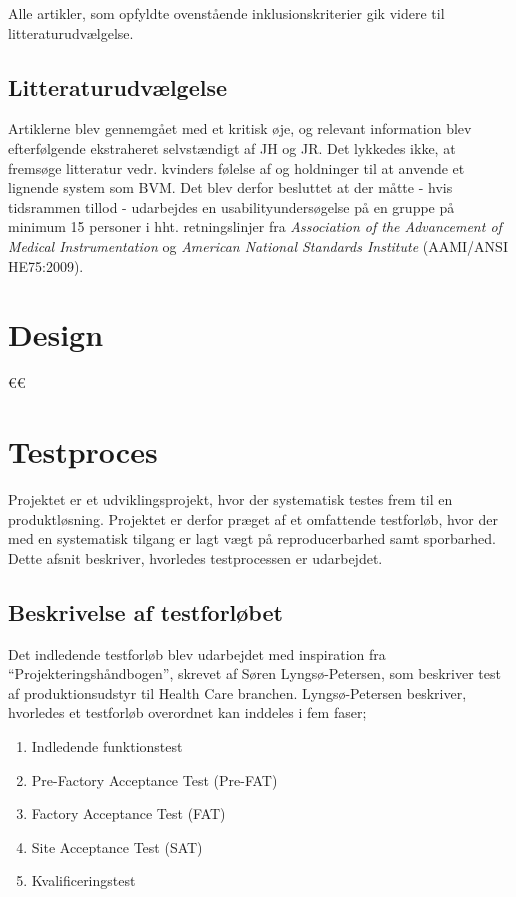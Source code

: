 	Alle artikler, som opfyldte ovenstående inklusionskriterier gik videre til litteraturudvælgelse. 	
		
	\subsection{Litteraturudvælgelse}	
	Artiklerne blev gennemgået med et kritisk øje, og relevant information blev efterfølgende ekstraheret selvstændigt af JH og JR. Det lykkedes ikke, at fremsøge litteratur vedr. kvinders følelse af og holdninger til at anvende et lignende system som BVM. Det blev derfor besluttet at der måtte - hvis tidsrammen tillod - udarbejdes en usabilityundersøgelse på en gruppe på minimum 15 personer i hht. retningslinjer fra \textit{Association of the Advancement of Medical Instrumentation} og \textit{American National Standards Institute} (AAMI/ANSI HE75:2009). \\

\section{Design}€€
\section{Testproces}
Projektet er et udviklingsprojekt, hvor der systematisk testes frem til en produktløsning. Projektet er derfor præget af et omfattende testforløb, hvor der med en systematisk tilgang er lagt vægt på reproducerbarhed samt sporbarhed. Dette afsnit beskriver, hvorledes testprocessen er udarbejdet. 

\subsection{Beskrivelse af testforløbet}
Det indledende testforløb blev udarbejdet med inspiration fra “Projekteringshåndbogen”, skrevet af Søren Lyngsø-Petersen, som beskriver test af produktionsudstyr til Health Care branchen. Lyngsø-Petersen beskriver, hvorledes et testforløb overordnet kan inddeles i fem faser;  

	\begin{enumerate}
		\item Indledende funktionstest
		\item Pre-Factory Acceptance Test (Pre-FAT)
		\item Factory Acceptance Test (FAT)
		\item Site Acceptance Test (SAT)
		\item Kvalificeringstest
	\end{enumerate}

